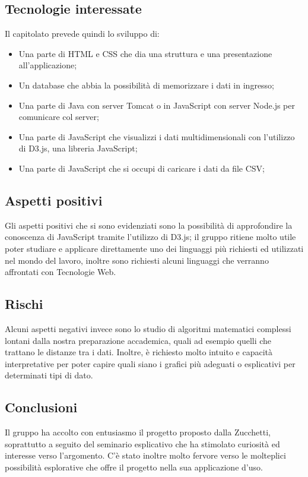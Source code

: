 \documentclass[../studio_di_fattibilita.tex]{subfiles}
\begin{document}
\subsection{Tecnologie interessate}%
\label{sub:c4_tecnologie_interessate}
Il capitolato prevede quindi lo sviluppo di:
\begin{itemize}
	\item Una parte di HTML e CSS che dia una struttura e una presentazione all’applicazione;
	\item Un database che abbia la possibilità di memorizzare i dati in ingresso;
	\item Una parte di Java con server Tomcat o in JavaScript con server Node.js per comunicare col server;
	\item Una parte di JavaScript che visualizzi i dati multidimensionali con l'utilizzo di D3.js, una libreria JavaScript;
	\item Una parte di JavaScript che si occupi di caricare i dati da file CSV;
\end{itemize}

\subsection{Aspetti positivi}%
\label{sub:c4_aspetti_positivi}
Gli aspetti positivi che si sono evidenziati sono la possibilità di approfondire la conoscenza di JavaScript tramite l’utilizzo di D3.js; il gruppo ritiene molto utile poter studiare e applicare direttamente uno dei linguaggi più richiesti ed utilizzati nel mondo del lavoro, inoltre sono richiesti alcuni linguaggi che verranno affrontati con Tecnologie Web.


\subsection{Rischi}%
\label{sub:c4_rischi}
Alcuni aspetti negativi invece sono lo studio di algoritmi matematici complessi lontani dalla nostra preparazione accademica, quali ad esempio quelli che trattano le distanze tra i dati. Inoltre, è richiesto molto intuito e capacità interpretative per poter capire quali siano i grafici più adeguati o esplicativi per determinati tipi di dato.

\subsection{Conclusioni}%
\label{sub:c4_conclusioni}
Il gruppo ha accolto con entusiasmo il progetto proposto dalla Zucchetti, soprattutto a seguito del seminario esplicativo che ha stimolato curiosità ed interesse verso l’argomento. C’è stato inoltre molto fervore verso le molteplici possibilità esplorative che offre il progetto nella sua applicazione d’uso.
\end{document}
